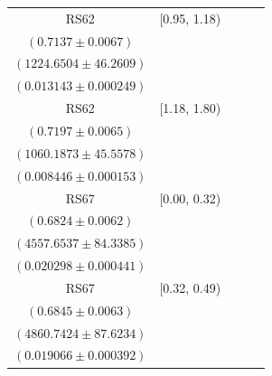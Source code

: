 {\begin{longtable}{|c|c|c|c|c|}
RS62 & [0.95, 1.18) & \begin{tabular}{@{}c@{}}$0.7061 \pm 0.0062$ \\ $(0.7137 \pm 0.0067)$\end{tabular} & \begin{tabular}{@{}c@{}}$1240.6728 \pm 46.7162$ \\ $(1224.6504 \pm 46.2609)$\end{tabular} & \begin{tabular}{@{}c@{}}$0.012283 \pm 0.000324$ \\ $(0.013143 \pm 0.000249)$\end{tabular} \\ \hline
RS62 & [1.18, 1.80) & \begin{tabular}{@{}c@{}}$0.6814 \pm 0.0069$ \\ $(0.7197 \pm 0.0065)$\end{tabular} & \begin{tabular}{@{}c@{}}$1119.8134 \pm 48.1200$ \\ $(1060.1873 \pm 45.5578)$\end{tabular} & \begin{tabular}{@{}c@{}}$0.008446 \pm 0.000202$ \\ $(0.008446 \pm 0.000153)$\end{tabular} \\ \hline
\hline
RS67 & [0.00, 0.32) & \begin{tabular}{@{}c@{}}$0.7383 \pm 0.0044$ \\ $(0.6824 \pm 0.0062)$\end{tabular} & \begin{tabular}{@{}c@{}}$4144.5377 \pm 77.2141$ \\ $(4557.6537 \pm 84.3385)$\end{tabular} & \begin{tabular}{@{}c@{}}$0.018992 \pm 0.000431$ \\ $(0.020298 \pm 0.000441)$\end{tabular} \\ \hline
RS67 & [0.32, 0.49) & \begin{tabular}{@{}c@{}}$0.7406 \pm 0.0044$ \\ $(0.6845 \pm 0.0063)$\end{tabular} & \begin{tabular}{@{}c@{}}$4400.6172 \pm 80.1012$ \\ $(4860.7424 \pm 87.6234)$\end{tabular} & \begin{tabular}{@{}c@{}}$0.018741 \pm 0.000389$ \\ $(0.019066 \pm 0.000392)$\end{tabular} \\ \hline

\end{longtable}}
